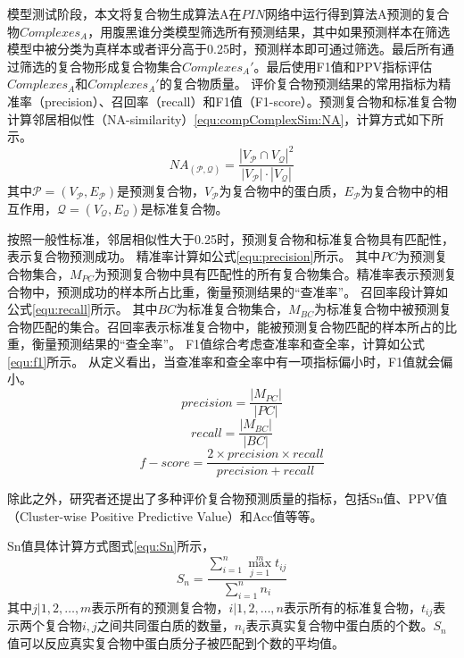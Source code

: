 模型测试阶段，本文将复合物生成算法A在$PIN$网络中运行得到算法A预测的复合物$Complexes_A$，用腹黑谁分类模型筛选所有预测结果，其中如果预测样本在筛选模型中被分类为真样本或者评分高于0.25时，预测样本即可通过筛选。最后所有通过筛选的复合物形成复合物集合$Complexes_A'$。最后使用F1值和PPV指标评估$Complexes_A$和$Complexes_A'$的复合物质量。
评价复合物预测结果的常用指标为精准率（precision）、召回率（recall）和F1值（F1-score）。预测复合物和标准复合物计算邻居相似性（NA-similarity）\ref{equ:compComplexSim:NA}，计算方式如下所示。
\begin{equation}
    \label{equ:compComplexSim:NA}
    NA_{(\mathcal{P} ,\mathcal{Q} )} = \frac{{\left\lvert V_{\mathcal{P}} \cap V_{\mathcal{Q}}\right\rvert}^2 }{{\left\lvert V_{\mathcal{P}} \right\rvert}\cdot  {\left\lvert V_{\mathcal{Q}} \right\rvert}}
\end{equation}
其中$\mathcal{P}=(V_{\mathcal{P}} ,E_{\mathcal{P}})$是预测复合物，$V_{\mathcal{P}}$为复合物中的蛋白质，$E_{\mathcal{P}}$为复合物中的相互作用，$\mathcal{Q}=(V_{\mathcal{Q}} ,E_{\mathcal{Q}})$是标准复合物。

按照一般性标准，邻居相似性大于0.25时，预测复合物和标准复合物具有匹配性，表示复合物预测成功。
精准率计算如公式\ref{equ:precision}所示。
其中$PC$为预测复合物集合，$M_{PC}$为预测复合物中具有匹配性的所有复合物集合。精准率表示预测复合物中，预测成功的样本所占比重，衡量预测结果的“查准率”。
召回率段计算如公式\ref{equ:recall}所示。
其中$BC$为标准复合物集合，$M_{BC}$为标准复合物中被预测复合物匹配的集合。召回率表示标准复合物中，能被预测复合物匹配的样本所占的比重，衡量预测结果的“查全率”。
F1值综合考虑查准率和查全率，计算如公式\ref{equ:f1}所示。
从定义看出，当查准率和查全率中有一项指标偏小时，F1值就会偏小。
\begin{equation}
    \label{equ:precision}
    precision=\frac{\left\lvert M_{PC}\right\rvert }{\left\lvert PC\right\rvert }
\end{equation}
\begin{equation}
    \label{equ:recall}
    recall=\frac{\left\lvert M_{BC}\right\rvert }{\left\lvert BC\right\rvert }
\end{equation}
\begin{equation}
    \label{equ:f1}
    f-score=\frac{2\times precision\times recall}{precision + recall }
\end{equation}

除此之外，研究者还提出了多种评价复合物预测质量的指标\cite{shi_protein_2011}，包括Sn值、PPV值（Cluster-wise Positive Predictive Value）和Acc值等等。

Sn值具体计算方式图式\ref{equ:Sn}所示，
\begin{equation}
    \label{equ:Sn}
    S_n=\frac{\sum_{i = 1}^{n} \max_{j=1}^{m} t_{ij}}{\sum_{i = 1}^{n}n_i}
\end{equation}
其中${j| 1,2,\dots,m }$表示所有的预测复合物，${i| 1,2,\dots,n }$表示所有的标准复合物，$t_{ij}$表示两个复合物$i,j$之间共同蛋白质的数量，$n_i$表示真实复合物中蛋白质的个数。$S_n$值可以反应真实复合物中蛋白质分子被匹配到个数的平均值。

